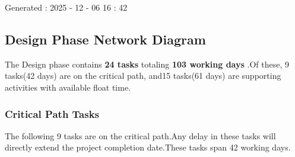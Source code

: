         Generated : 2025 -
    12 -
    06 16 : 42 %

\subsection{Design Phase Network Diagram}

                 The Design phase contains \textbf{24 tasks} totaling \textbf{
                     103 working days}
                     .Of these,
    9 tasks(42 days) are on the critical path,
    and15 tasks(61 days) are supporting activities with available float time.

\vspace {
  0.5em
}

\subsubsection { Critical Path Tasks }

\noindent The following 9 tasks are on the critical
    path.Any delay in these tasks will directly extend the project completion
        date.These tasks span 42 working days.

\vspace {
  0.5em
}

